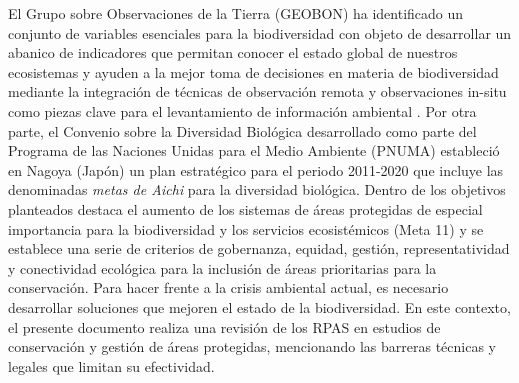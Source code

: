 \documentclass[onecolumn]{extarticle}
\begin{document}
El Grupo sobre Observaciones de la Tierra (GEOBON) ha identificado un
conjunto de variables esenciales para la biodiversidad
\citep{Pereira2013} con objeto de desarrollar un abanico de indicadores
que permitan conocer el estado global de nuestros ecosistemas y ayuden a
la mejor toma de decisiones en materia de biodiversidad mediante la
integración de técnicas de observación remota y observaciones in-situ
como piezas clave para el levantamiento de información ambiental
\citep{Forum2008}. Por otra parte, el Convenio sobre la Diversidad
Biológica desarrollado como parte del Programa de las Naciones Unidas
para el Medio Ambiente (PNUMA) estableció en Nagoya (Japón) un plan
estratégico para el periodo 2011-2020 que incluye las denominadas
\emph{metas de Aichi} para la diversidad biológica. Dentro de los
objetivos planteados destaca el aumento de los sistemas de áreas
protegidas de especial importancia para la biodiversidad y los servicios
ecosistémicos (Meta 11) y se establece una serie de criterios de
gobernanza, equidad, gestión, representatividad y conectividad ecológica
para la inclusión de áreas prioritarias para la conservación. Para hacer
frente a la crisis ambiental actual, es necesario desarrollar soluciones
que mejoren el estado de la biodiversidad. En este contexto, el presente
documento realiza una revisión de los RPAS en estudios de conservación y
gestión de áreas protegidas, mencionando las barreras técnicas y legales
que limitan su efectividad.
\end{document}

